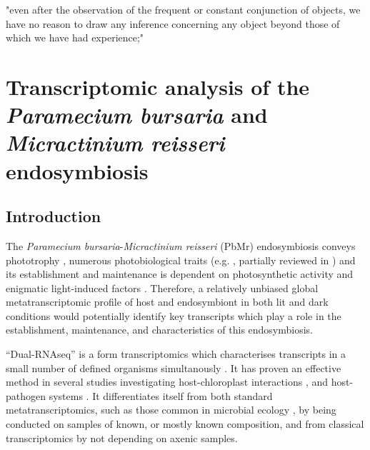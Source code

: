 \graphicspath{{chapters/4.Chapter2/figures/}}

\begin{savequote}[75mm]
"even after the observation of the frequent or constant conjunction of objects, we have no reason to draw any inference concerning any object beyond those of which we have had experience;"
\end{savequote}

\chapter{Transcriptomic analysis of the \textit{Paramecium bursaria} and \textit{Micractinium reisseri} endosymbiosis}

\section{Introduction}

The \textit{Paramecium bursaria}-\textit{Micractinium reisseri} (PbMr) endosymbiosis 
conveys phototrophy \citep{Karakashian1963}, numerous photobiological traits (e.g. \citep{Berk1991,Saji1974,Nakajima1989,Niess1982a,Iwatsuki1988,Summerer2009}, 
partially reviewed in \citep{Sommaruga2009}) and its establishment and maintenance 
is dependent on photosynthetic activity and enigmatic light-induced factors \citep{Karakashian1963,Hosoya1995a,Kodama2007,Kodama2014c}.
Therefore, a relatively unbiased global metatranscriptomic profile of host and endosymbiont in both lit and dark conditions 
would potentially identify key transcripts which play a role in the establishment, maintenance, and characteristics 
of this endosymbiosis. 


``Dual-RNAseq'' is a form transcriptomics which characterises transcripts in a small number of defined organisms simultanously \citep{Westermann2012}.
It has proven an effective method in several studies investigating host-chloroplast interactions \citep{Nowack2011,Jiggins2013,Xiang2015},
and host-pathogen systems \citep{Tieryney2012,Kawahara2012,Jones2014,Hayden2014}.
It differentiates itself from both standard metatranscriptomics, such as those common in microbial ecology \citep{Poretsky2005,AliagaGoltsman2014},
by being conducted on samples of known, or mostly known composition, and from classical transcriptomics
by not depending on axenic samples. 


